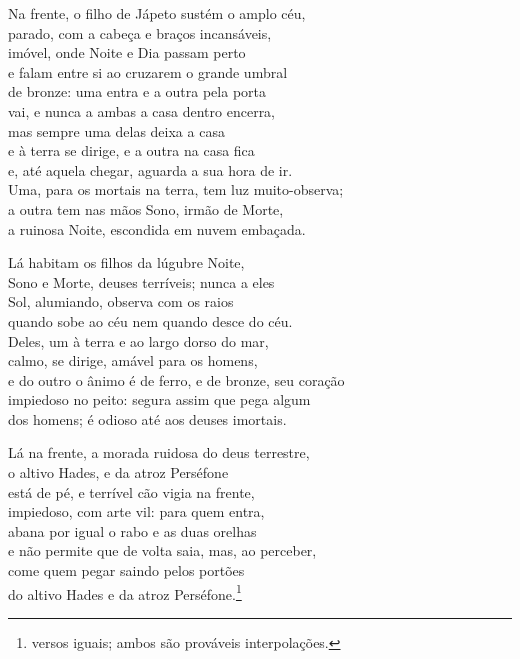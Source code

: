 \quad{}Na frente, o filho de Jápeto sustém o amplo céu,\\
parado, com a cabeça e braços incansáveis,\\
imóvel, onde Noite e Dia passam perto\\
e falam entre si ao cruzarem o grande umbral\\
de bronze: uma entra e a outra pela porta \\
vai, e nunca a ambas a casa dentro encerra,\\
mas sempre uma delas deixa a casa\\
e à terra se dirige, e a outra na casa fica\\
e, até aquela chegar, aguarda a sua hora de ir.\\
Uma, para os mortais na terra, tem luz muito-observa; \\
a outra tem nas mãos Sono, irmão de Morte,\\
a ruinosa Noite, escondida em nuvem embaçada.

\quad{}Lá habitam os filhos da lúgubre Noite,\\
Sono e Morte, deuses terríveis; nunca a eles\\
Sol, alumiando, observa com os raios \\
quando sobe ao céu nem quando desce do céu.\\
Deles, um à terra e ao largo dorso do mar,\\
calmo, se dirige, amável para os homens,\\
e do outro o ânimo é de ferro, e de bronze, seu coração\\
impiedoso no peito: segura assim que pega algum \\
dos homens; é odioso até aos deuses imortais.

\quad{}Lá na frente, a morada ruidosa do deus terrestre,\\
o altivo Hades, e da atroz Perséfone\\
está de pé, e terrível cão vigia na frente,\\
impiedoso, com arte vil: para quem entra, \\
abana por igual o rabo e as duas orelhas\\
e não permite que de volta saia, mas, ao perceber,\\
come quem pegar saindo pelos portões\\
do altivo Hades e da atroz Perséfone.\footnote{versos iguais; ambos são prováveis interpolações.}

